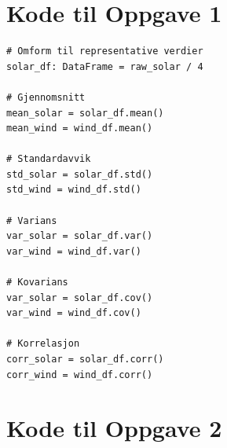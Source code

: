 \documentclass{article}
\begin{document}
\section{Kode til Oppgave 1}\label{sec:oppg1}
\begin{verbatim}
# Omform til representative verdier
solar_df: DataFrame = raw_solar / 4

# Gjennomsnitt
mean_solar = solar_df.mean()
mean_wind = wind_df.mean()

# Standardavvik
std_solar = solar_df.std()
std_wind = wind_df.std()

# Varians
var_solar = solar_df.var()
var_wind = wind_df.var()

# Kovarians
var_solar = solar_df.cov()
var_wind = wind_df.cov()

# Korrelasjon
corr_solar = solar_df.corr()
corr_wind = wind_df.corr()
\end{verbatim}

\section{Kode til Oppgave 2}\label{sec:oppg2}
\end{document}
